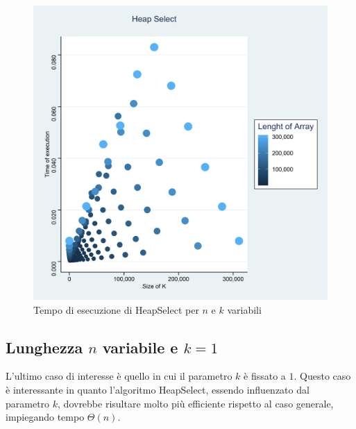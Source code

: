 \documentclass{article}
\begin{document}
	\begin{figure}[h!]
  		\includegraphics[width=\linewidth]{images/HeapSelect3d_in2d.png}
  		\caption{Tempo di esecuzione di HeapSelect per $n$ e $k$ variabili}
  		\label{fig:graph5}
	\end{figure}
		
	\newpage
	
	
	\subsection{Lunghezza $n$ variabile e $k=1$}
	L'ultimo caso di interesse è quello in cui il parametro $k$ è fissato a $1$. Questo caso è interessante in quanto l'algoritmo HeapSelect, essendo influenzato dal parametro $k$, dovrebbe risultare molto più efficiente rispetto al caso generale, impiegando tempo $\Theta\left(n\right)$.
	
\end{document}
